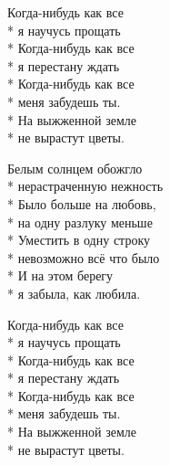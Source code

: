 \begin{minipage}{\linewidth}
\hspace*{1.5em}Когда-нибудь как все\\*
\hspace*{1.5em}я научусь прощать\\*
\hspace*{1.5em}Когда-нибудь как все\\*
\hspace*{1.5em}я перестану ждать\\*
\hspace*{1.5em}Когда-нибудь как все\\*
\hspace*{1.5em}меня забудешь ты.\\*
\hspace*{1.5em}На выжженной земле\\*
\hspace*{1.5em}не вырастут цветы.\\
\end{minipage}\par\medskip\nobreak

\medskip

\begin{minipage}{\linewidth}
Белым солнцем обожгло\\*
нерастраченную нежность\\*
Было больше на любовь,\\*
на одну разлуку меньше\\*
Уместить в одну строку\\*
невозможно всё что было\\*
И на этом берегу\\*
я забыла, как любила.\\
\end{minipage}\par\medskip\nobreak

\medskip

\begin{minipage}{\linewidth}
\hspace*{1.5em}Когда-нибудь как все\\*
\hspace*{1.5em}я научусь прощать\\*
\hspace*{1.5em}Когда-нибудь как все\\*
\hspace*{1.5em}я перестану ждать\\*
\hspace*{1.5em}Когда-нибудь как все\\*
\hspace*{1.5em}меня забудешь ты.\\*
\hspace*{1.5em}На выжженной земле\\*
\hspace*{1.5em}не вырастут цветы.\\
\end{minipage}\par\medskip\nobreak

